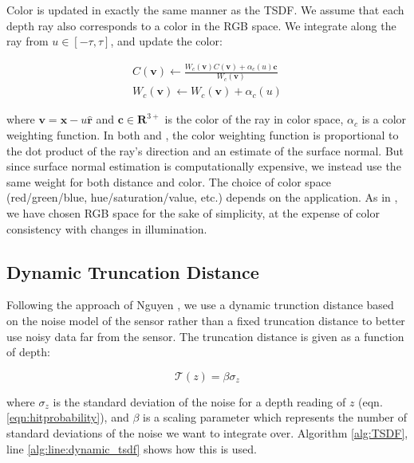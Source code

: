 \documentclass[10pt,twocolumn,letterpaper]{article}
\begin{document}
Color is updated in exactly the same manner as the TSDF. We assume that each
depth ray also corresponds to a color in the RGB space. We integrate along the
ray from $u \in [-\tau, \tau]$, and update the color:

\begin{align}
C(\mathbf{v}) \gets \frac{W_c(\mathbf{v}) C(\mathbf{v}) +
\alpha_c(u) \mathbf{c}}{W_c(\mathbf{v})}
\\
%
W_c(\mathbf{v}) \gets W_c(\mathbf{v}) + \alpha_c(u)
\end{align}

\noindent where $\mathbf{v} = \mathbf{x} - u\mathbf{\hat{r}}$ and $\mathbf{c}
\in \mathbf{R}^{3+}$ is the color of the ray in color space, $\alpha_c$ is a
color weighting function. In both \cite{Bylow2013} and \cite{Whelan2013}, the color weighting function is proportional to the dot
product of the ray's direction and an estimate of the surface normal. But since
surface normal estimation is computationally expensive, we instead use the same
weight for both distance and color. The choice of color space (red/green/blue,
hue/saturation/value, etc.) depends on the application. As in \cite{Bylow2013}, we have chosen RGB space for the sake
of simplicity, at the expense of color consistency with changes in illumination.


\subsection{Dynamic Truncation Distance}
\label{section:dynamic_trunc}
Following the approach of Nguyen \etal\cite{Nguyen2012}, we use a dynamic
trunction distance based on the noise model of the sensor rather than a fixed
truncation distance to better use noisy data far from the sensor. The truncation
distance is given as a function of depth:

\begin{equation} \mathcal{T} (z) = \beta\sigma_{z} \end{equation}

\noindent where $\sigma_{z}$ is the standard deviation of the noise for a depth
reading of $z$ (eqn. \ref{eqn:hitprobability}), and $\beta$ is a scaling
parameter which represents the number of standard deviations of the noise we
want to integrate over. Algorithm \ref{alg:TSDF}, line
\ref{alg:line:dynamic_tsdf} shows how this is used.
% 
\end{document}
